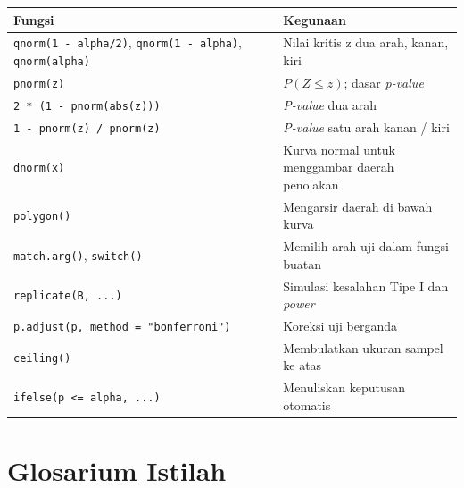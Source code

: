 \documentclass[
  indonesian,
  letterpaper,
]{book}
\newcounter{none} %
\begin{document}
{\def\LTcaptype{none} %
\begin{longtable}[]{@{}
  >{\raggedright\arraybackslash}p{}
  >{\raggedright\arraybackslash}p{}@{}}
\toprule\noalign{}
\begin{minipage}[b]{\linewidth}\raggedright
Fungsi
\end{minipage} & \begin{minipage}[b]{\linewidth}\raggedright
Kegunaan
\end{minipage} \\
\midrule\noalign{}
\endhead
\bottomrule\noalign{}
\endlastfoot
\texttt{qnorm(1\ -\ alpha/2)}, \texttt{qnorm(1\ -\ alpha)},
\texttt{qnorm(alpha)} & Nilai kritis z dua arah, kanan, kiri \\
\texttt{pnorm(z)} & \(P(Z \leq z)\); dasar \emph{p-value} \\
\texttt{2\ *\ (1\ -\ pnorm(abs(z)))} & \emph{P-value} dua arah \\
\texttt{1\ -\ pnorm(z)\ /\ pnorm(z)} & \emph{P-value} satu arah kanan /
kiri \\
\texttt{dnorm(x)} & Kurva normal untuk menggambar daerah penolakan \\
\texttt{polygon()} & Mengarsir daerah di bawah kurva \\
\texttt{match.arg()}, \texttt{switch()} & Memilih arah uji dalam fungsi
buatan \\
\texttt{replicate(B,\ ...)} & Simulasi kesalahan Tipe I dan
\emph{power} \\
\texttt{p.adjust(p,\ method\ =\ "bonferroni")} & Koreksi uji berganda \\
\texttt{ceiling()} & Membulatkan ukuran sampel ke atas \\
\texttt{ifelse(p\ \textless{}=\ alpha,\ ...)} & Menuliskan keputusan
otomatis \\
\end{longtable}
}

\section{Glosarium Istilah}\label{glosarium-istilah-1}
\end{document}

